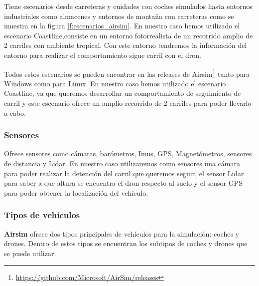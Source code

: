 Tiene escenarios desde carreteras y cuidades con coches simulados hasta entornos industriales como almacenes y entornos de montaña con carreteras como se 
muestra en la figura \ref{f:escenarios_airsim}. En nuestro caso
hemos utilizado el escenario Coastline,consiste en un entorno fotorrealista de un recorrido amplio de 2 carriles con ambiente tropical. Con este entorno tendremos la
información del entorno para realizar el comportamiento sigue carril con el dron. \newline

Todos estos escenarios se pueden encontrar en las releases de Airsim\footnote{\url{https://github.com/Microsoft/AirSim/releases}} tanto para Windows como para Linux.
En nuestro caso hemos utilizado el escenario Coastline, ya que queremos desarrollar un comportamiento de seguimiento de carril y este escenario ofrece un amplio recorrido de 2 carriles para poder llevarlo
a cabo.



\subsubsection{Sensores}
\label{sec:airsim}
Ofrece sensores como cámaras, barómetros, Imus, GPS, Magnetómetros, sensores de distancia y Lidar.
En nuestro caso utilizaremos como sensores una cámara para poder realizar la detención del carril 
que queremos seguir, el sensor Lidar para saber a que altura se encuentra el dron respecto al suelo y el sensor
GPS para poder obtener la localización del vehículo. 

\subsubsection{Tipos de vehículos}
\label{sec:airsim}
\textbf{Airsim} ofrece dos tipos principales de vehículos para la simulación: coches y drones. Dentro de estos tipos se encuentran los subtipos de coches y drones que se puede utilizar.

